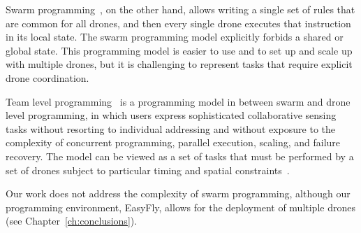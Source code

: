 Swarm programming~\cite{quigley2009ros}, on the other hand, allows writing a single set of rules that are common for all drones, and then every single drone 
executes that instruction in its local state. The swarm programming model explicitly forbids a shared or global state.
This programming model is easier to use and to set up and scale up with multiple drones, but it is challenging to represent tasks that require explicit drone coordination.

Team level programming~\cite{mottola2014team} is a programming model in between swarm and drone level programming, 
in which users express sophisticated collaborative sensing tasks without resorting to individual addressing 
and without exposure to the complexity of concurrent programming, parallel execution, scaling, and failure recovery.
The model can be viewed as a set of tasks that must be performed by a set of drones subject to particular timing and spatial constraints~\cite{mottola2014team}.

Our work does not address the complexity of swarm programming, although our programming environment, EasyFly, allows for the deployment of multiple drones (see Chapter~\ref{ch:conclusions}).